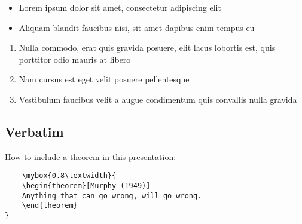 \begin{itemize}
    \item Lorem ipsum dolor sit amet, consectetur adipiscing elit
    \item Aliquam blandit faucibus nisi, sit amet dapibus enim tempus eu
\end{itemize}

\begin{enumerate}
    \item Nulla commodo, erat quis gravida posuere, elit lacus lobortis est, quis porttitor odio mauris at libero
    \item Nam cursus est eget velit posuere pellentesque
    \item Vestibulum faucibus velit a augue condimentum quis convallis nulla gravida
\end{enumerate}

\clearpage


\subsection{Verbatim}

How to include a theorem in this presentation:
\begin{verbatim}
    \mybox{0.8\textwidth}{
    \begin{theorem}[Murphy (1949)]
    Anything that can go wrong, will go wrong.
    \end{theorem}
}
\end{verbatim}

\clearpage